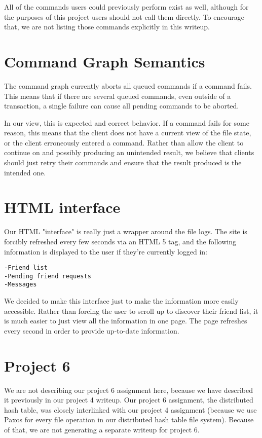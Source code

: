 \documentclass[11pt]{article}
\begin{document}
All of the commands users could previously perform exist as well, although for the purposes of this project users should not call them directly. To encourage that, we are not listing those commands explicitly in this writeup.

\section{Command Graph Semantics}

The command graph currently aborts all queued commands if a command fails.  This means that if there are several queued commands, even outside of a transaction, a single failure can cause all pending commands to be aborted. 

In our view, this is expected and correct behavior. If a command fails for some reason, this means that the client does not have a current view of the file state, or the client erroneously entered a command. Rather than allow the client to continue on and possibly producing an unintended result, we believe that clients should just retry their commands and ensure that the result produced is the intended one.

\section{HTML interface}

Our HTML "interface" is really just a wrapper around the file logs. The site is forcibly refreshed every few seconds via an HTML 5 tag, and the following information is displayed to the user if they're currently logged in:

\begin{verbatim}
-Friend list
-Pending friend requests
-Messages
\end{verbatim}

We decided to make this interface just to make the information more easily accessible. Rather than forcing the user to scroll up to discover their friend list, it is much easier to just view all the information in one page. The page refreshes every second in order to provide up-to-date information.

\section{Project 6}

We are not describing our project 6 assignment here, because we have described it previously in our project 4 writeup. Our project 6 assignment, the distributed hash table, was closely interlinked with our project 4 assignment (because we use Paxos for every file operation in our distributed hash table file system). Because of that, we are not generating a separate writeup for project 6.
\end{document}
